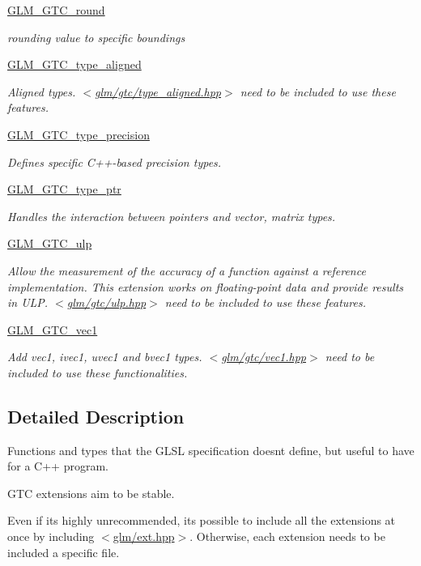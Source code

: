 \begin{DoxyCompactItemize}
\hyperlink{group__gtc__round}{G\+L\+M\+\_\+\+G\+T\+C\+\_\+round}
\begin{DoxyCompactList}\small\item\em rounding value to specific boundings \end{DoxyCompactList}\item 
\hyperlink{group__gtc__type__aligned}{G\+L\+M\+\_\+\+G\+T\+C\+\_\+type\+\_\+aligned}
\begin{DoxyCompactList}\small\item\em Aligned types. $<$\hyperlink{gtc_2type__aligned_8hpp}{glm/gtc/type\+\_\+aligned.\+hpp}$>$ need to be included to use these features. \end{DoxyCompactList}\item 
\hyperlink{group__gtc__type__precision}{G\+L\+M\+\_\+\+G\+T\+C\+\_\+type\+\_\+precision}
\begin{DoxyCompactList}\small\item\em Defines specific C++-\/based precision types. \end{DoxyCompactList}\item 
\hyperlink{group__gtc__type__ptr}{G\+L\+M\+\_\+\+G\+T\+C\+\_\+type\+\_\+ptr}
\begin{DoxyCompactList}\small\item\em Handles the interaction between pointers and vector, matrix types. \end{DoxyCompactList}\item 
\hyperlink{group__gtc__ulp}{G\+L\+M\+\_\+\+G\+T\+C\+\_\+ulp}
\begin{DoxyCompactList}\small\item\em Allow the measurement of the accuracy of a function against a reference implementation. This extension works on floating-\/point data and provide results in U\+LP. $<$\hyperlink{ulp_8hpp}{glm/gtc/ulp.\+hpp}$>$ need to be included to use these features. \end{DoxyCompactList}\item 
\hyperlink{group__gtc__vec1}{G\+L\+M\+\_\+\+G\+T\+C\+\_\+vec1}
\begin{DoxyCompactList}\small\item\em Add vec1, ivec1, uvec1 and bvec1 types. $<$\hyperlink{vec1_8hpp}{glm/gtc/vec1.\+hpp}$>$ need to be included to use these functionalities. \end{DoxyCompactList}\end{DoxyCompactItemize}


\subsection{Detailed Description}
Functions and types that the G\+L\+SL specification doesn\textquotesingle{}t define, but useful to have for a C++ program. 

G\+TC extensions aim to be stable.

Even if it\textquotesingle{}s highly unrecommended, it\textquotesingle{}s possible to include all the extensions at once by including $<$\hyperlink{ext_8hpp}{glm/ext.\+hpp}$>$. Otherwise, each extension needs to be included a specific file. 